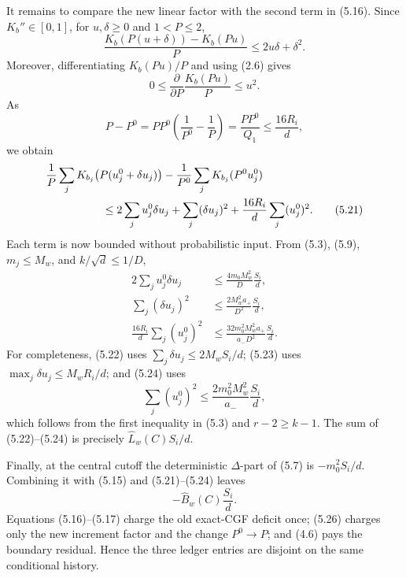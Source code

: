 It remains to compare the new linear factor with the second term in
(5.16).  Since \(K_b''\in[0,1]\), for \(u,\delta\ge0\) and \(1<P\le2\),
\[
 \frac{K_b(P(u+\delta))-K_b(Pu)}P\le2u\delta+\delta^2.
\tag{5.18}
\]
Moreover, differentiating \(K_b(Pu)/P\) and using (2.6) gives
\[
 0\le\frac{\partial}{\partial P}\frac{K_b(Pu)}P\le u^2.
\tag{5.19}
\]
As
\[
 P-P^0=PP^0\left(\frac1{P^0}-\frac1P\right)
 =\frac{PP^0}{Q_1}\le\frac{16R_i}{d},
\tag{5.20}
\]
we obtain
\begin{align}
&\frac1P\sum_jK_{b_j}\bigl(P(u_j^0+\delta u_j)\bigr)
-\frac1{P^0}\sum_jK_{b_j}(P^0u_j^0)\notag\\
&\hspace{18mm}\le
2\sum_ju_j^0\delta u_j+\sum_j(\delta u_j)^2
+\frac{16R_i}{d}\sum_j(u_j^0)^2.
\tag{5.21}
\end{align}
Each term is now bounded without probabilistic input.  From (5.3), (5.9),
\(m_j\le M_w\), and \(k/\sqrt d\le1/D\),
\begin{align}
2\sum_ju_j^0\delta u_j
&\le\frac{4m_0M_w^2}{D}\frac{S_i}{d},\tag{5.22}\\
\sum_j(\delta u_j)^2
&\le\frac{2M_w^2a_+}{D^2}\frac{S_i}{d},\tag{5.23}\\
\frac{16R_i}{d}\sum_j(u_j^0)^2
&\le\frac{32m_0^2M_w^2a_+}{a_-D^2}\frac{S_i}{d}.
\tag{5.24}
\end{align}
For completeness, (5.22) uses
\(\sum_j\delta u_j\le2M_wS_i/d\); (5.23) uses
\(\max_j\delta u_j\le M_wR_i/d\); and (5.24) uses
\[
 \sum_j(u_j^0)^2\le
 \frac{2m_0^2M_w^2}{a_-}\frac{S_i}{d},
\tag{5.25}
\]
which follows from the first inequality in (5.3) and \(r-2\ge k-1\).
The sum of (5.22)--(5.24) is precisely
\(\widehat L_w(C)S_i/d\).

Finally, at the central cutoff the deterministic \(\Delta\)-part of
(5.7) is \(-m_0^2S_i/d\).  Combining it with (5.15) and
(5.21)--(5.24) leaves
\[
 -\widehat B_w(C)\frac{S_i}{d}.
\tag{5.26}
\]
Equations (5.16)--(5.17) charge the old exact-CGF deficit once;
(5.26) charges only the new increment factor and the change
\(P^0\to P\); and (4.6) pays the boundary residual.  Hence the three
ledger entries are disjoint on the same conditional history.
